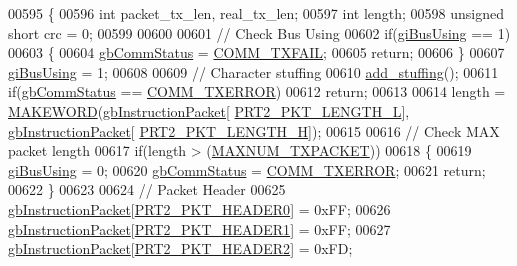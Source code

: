 \begin{DoxyCode}
00595 \{
00596     \textcolor{keywordtype}{int} packet\_tx\_len, real\_tx\_len;
00597     \textcolor{keywordtype}{int} length;
00598     \textcolor{keywordtype}{unsigned} \textcolor{keywordtype}{short} crc = 0;
00599 
00600 
00601     \textcolor{comment}{// Check Bus Using}
00602     \textcolor{keywordflow}{if}(\hyperlink{classdynamixel2_a7fc43b4c4b7e36aa8f0420b037658f83}{giBusUsing} == 1)
00603     \{
00604         \hyperlink{classdynamixel2_a703e327ba8ec5909c238dc94a00cb32d}{gbCommStatus} = \hyperlink{dynamixel_8h_af88390c8be18c4079e65fd07b8d553be}{COMM\_TXFAIL};
00605         \textcolor{keywordflow}{return};
00606     \}
00607     \hyperlink{classdynamixel2_a7fc43b4c4b7e36aa8f0420b037658f83}{giBusUsing} = 1;
00608 
00609     \textcolor{comment}{// Character stuffing}
00610     \hyperlink{classdynamixel2_a350920b911d0ad2116b91f2149b840c7}{add\_stuffing}();
00611     \textcolor{keywordflow}{if}(\hyperlink{classdynamixel2_a703e327ba8ec5909c238dc94a00cb32d}{gbCommStatus} == \hyperlink{dynamixel_8h_a1bd7c7b30db4f56dc80cef65ad38afff}{COMM\_TXERROR})
00612         \textcolor{keywordflow}{return};
00613 
00614     length = \hyperlink{dynamixel_8h_a6b98c16b8e3e7733dd4063d0b0fac24c}{MAKEWORD}(\hyperlink{classdynamixel2_a298efe9115fdbf77019af1001e801fb4}{gbInstructionPacket}[
      \hyperlink{dynamixel_8h_a9e77ab568957b64786c810967dec8b0c}{PRT2\_PKT\_LENGTH\_L}], \hyperlink{classdynamixel2_a298efe9115fdbf77019af1001e801fb4}{gbInstructionPacket}[
      \hyperlink{dynamixel_8h_a5ea18a21d722bf72217d5408c4d2a868}{PRT2\_PKT\_LENGTH\_H}]);
00615 
00616     \textcolor{comment}{// Check MAX packet length}
00617     \textcolor{keywordflow}{if}(length > (\hyperlink{dxl__hal_8h_ad753363487043da5d9fdd3fd1071f59e}{MAXNUM\_TXPACKET}))
00618     \{
00619         \hyperlink{classdynamixel2_a7fc43b4c4b7e36aa8f0420b037658f83}{giBusUsing} = 0;
00620         \hyperlink{classdynamixel2_a703e327ba8ec5909c238dc94a00cb32d}{gbCommStatus} = \hyperlink{dynamixel_8h_a1bd7c7b30db4f56dc80cef65ad38afff}{COMM\_TXERROR};
00621         \textcolor{keywordflow}{return};
00622     \}
00623 
00624     \textcolor{comment}{// Packet Header}
00625     \hyperlink{classdynamixel2_a298efe9115fdbf77019af1001e801fb4}{gbInstructionPacket}[\hyperlink{dynamixel_8h_ab65834fcbbcf4701f1f4569d664ccdda}{PRT2\_PKT\_HEADER0}]   = 0xFF;
00626     \hyperlink{classdynamixel2_a298efe9115fdbf77019af1001e801fb4}{gbInstructionPacket}[\hyperlink{dynamixel_8h_a75438118bc73a597bf0f83c9fcb2a49c}{PRT2\_PKT\_HEADER1}]   = 0xFF;
00627     \hyperlink{classdynamixel2_a298efe9115fdbf77019af1001e801fb4}{gbInstructionPacket}[\hyperlink{dynamixel_8h_a7859877a1efdc93afffea61c243a3254}{PRT2\_PKT\_HEADER2}]   = 0xFD;

\end{DoxyCode}
